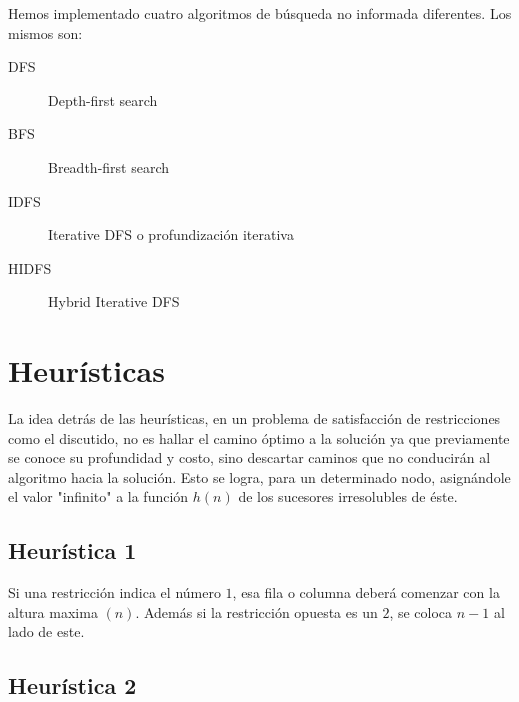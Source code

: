 \documentclass[%
	final,
	reprint,
	notitlepage,
	narroweqnarray,
	inline,
	twoside,
	invited
	]{ieee}
\begin{document}
\par Hemos implementado cuatro algoritmos de búsqueda no informada diferentes. Los mismos son:

\begin{description}

\item[DFS]
Depth-first search

\item[BFS]
Breadth-first search

\item[IDFS]
Iterative DFS o profundización iterativa

\item[HIDFS]
Hybrid Iterative DFS

\end{description}

\section{Heurísticas}

\par La idea detrás de las heurísticas, en un  problema de satisfacción de restricciones como el discutido, no es hallar el camino óptimo a la solución ya que previamente se conoce su profundidad y  costo,  sino descartar caminos que no conducirán al algoritmo hacia la solución. Esto se logra, para un determinado nodo, asignándole el valor "infinito" a la función $h(n)$ de los sucesores irresolubles de éste.\\

\subsection{Heurística 1}

\par Si una restricción indica el número $1$, esa fila o columna deberá comenzar con la altura maxima $(n)$. Además si la restricción opuesta es un $2$, se coloca $n-1$ al lado de este.

\subsection{Heurística 2}
\end{document}
